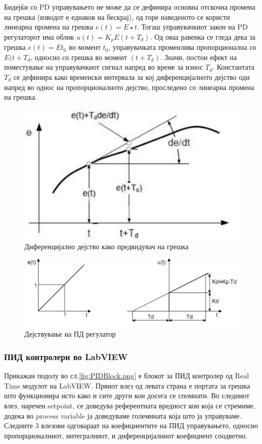 \documentclass[12pt]{article}
\begin{document}
			Бидејќи со PD управувањето не може да се дефинира основна отскочна промена на грешка (изводот е еднаков на бескрај), од горе наведеното се користи линеарна промена на грешка $e(t) = E\star t$. Тогаш управувачкиот закон на PD регулаторот има облик $u(t) = K_{p}E(t+T_{d})$. Од оваа равенка се гледа дека за грешка $e(t)=Et_{0}$ во момент $t_{0}$, управувачката променлива пропорционална со $E(t+T_{d}$, односно со грешка во момент $(t+T_{d})$. Значи, постои ефект на поместување на управувачкиот сигнал напред во време за износ $T_{d}$. Константата $T_{d}$ се дефинира како временски интервала за кој диференцијалното дејство оди напред во однос на пропорционалното дејство, проследено со линеарна промена на грешка.

			\begin{figure}[H]
				\includegraphics[width=0.3\linewidth]{./images/el_8.png}
				\centering
				\caption{Диференцијално дејство како предвидувач на грешка}
				\label{fig:el_8.png}
				\end{figure}

			\begin{figure}[H]
				\includegraphics[width=0.3\linewidth]{./images/el_9.png}
				\centering
				\caption{Дејствување на ПД регулатор}
				\label{fig:el_9.png}
				\end{figure}



    \subsubsection{ПИД контролери во LabVIEW}

			Прикажан подолу во сл.\ref{fig:PIDBlock.png} е блокот за ПИД контролер од Real Time модулот на LabVIEW. Првиот влез од левата страна е портата за грешка што функционира исто како и сите други кои досега се спомнати. Во следниот влез, наречен setpoint, се доведува референтната вредност кон која се стремиме, додека во process variable ја доведуваме големината која што ја управуваме. Следните 3 влезови одговараат на коефициентите на ПИД управувањето, односно пропорционалниот, интегралниот, и диференцијалниот коефициент соодветно.
\end{document}
